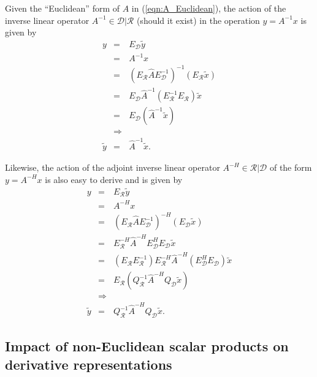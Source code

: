 Given the ``Euclidean'' form of $A$ in (\ref{eqn:A_Euclidean}), the action of
the inverse linear operator $A^{-1}\in\mathcal{D}|\mathcal{R}$ (should it
exist) in the operation $y = A^{-1} x$ is given by
%
\begin{eqnarray}
y
& = & E_{\mathcal{D}} \tilde{y} \nonumber \\
& = & A^{-1} x \nonumber \\
& = & (E_{\mathcal{R}} \hat{A} E_{\mathcal{D}}^{-1})^{-1} (E_{\mathcal{R}} \tilde{x}) \nonumber \\
& = & E_{\mathcal{D}} \hat{A}^{-1} (E_{\mathcal{R}}^{-1} E_{\mathcal{R}}) \tilde{x}  \nonumber \\
& = & E_{\mathcal{D}} ( \hat{A}^{-1} \tilde{x} ) \nonumber \\
& \Rightarrow &  \nonumber \\
\tilde{y} & = & \hat{A}^{-1} \tilde{x}.
\label{eqn:A_Euclidean_matrix_inverse_apply}
\end{eqnarray}
%

Likewise, the action of the adjoint inverse linear operator
$A^{-H}\in\mathcal{R}|\mathcal{D}$ of the form $y = A^{-H} x$ is also easy to
derive and is given by
%
\begin{eqnarray}
y
& = & E_{\mathcal{R}} \tilde{y} \nonumber \\
& = & A^{-H} x \nonumber \\
& = & (E_{\mathcal{R}} \hat{A} E_{\mathcal{D}}^{-1})^{-H} (E_{\mathcal{D}} \tilde{x}) \nonumber \\
& = & E_{\mathcal{R}}^{-H} \hat{A}^{-H} E_{\mathcal{D}}^H E_{\mathcal{D}} \tilde{x}  \nonumber \\
& = & ( E_{\mathcal{R}} E_{\mathcal{R}}^{-1} ) E_{\mathcal{R}}^{-H} \hat{A}^{-H} ( E_{\mathcal{D}}^H E_{\mathcal{D}} ) \tilde{x}  \nonumber \\
& = & E_{\mathcal{R}} ( Q_{\mathcal{R}}^{-1} \hat{A}^{-H} Q_{\mathcal{D}} \tilde{x} ) \nonumber \\
& \Rightarrow &  \nonumber \\
\tilde{y} & = & Q_{\mathcal{R}}^{-1} \hat{A}^{-H} Q_{\mathcal{D}} \tilde{x}.
\label{eqn:A_Euclidean_matrix_adjoint_inverse_apply}
\end{eqnarray}
%

\subsection{Impact of non-Euclidean scalar products on derivative representations}

